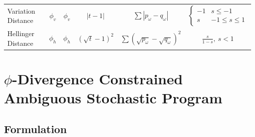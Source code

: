 \documentclass[opre,nonblindrev]{informs3} %
\begin{document}
\begin{table}
{\begin{tabular}{lccccc}
		Variation Distance                & $\phi_v$           & $\phi_v$                        & $|t-1|$               & $\sum |p_\omega - q_\omega|$                               & $\begin{cases} -1 & s \leq -1 \\ s & -1 \leq s \leq 1 \end{cases}$ \\
		Hellinger Distance                & $\phi_h$           & $\phi_h$                        & $(\sqrt{t} - 1)^2$    & $\sum (\sqrt{p_\omega} - \sqrt{q_\omega})^2$               & $\frac{s}{1-s},\ s < 1$ \\
	\hline
	\end{tabular}}
	{}
\end{table}

\section{$\phi$-Divergence Constrained Ambiguous Stochastic Program}
\label{sec:plp2}


\subsection{Formulation}
\label{ssec:form}
\end{document}
